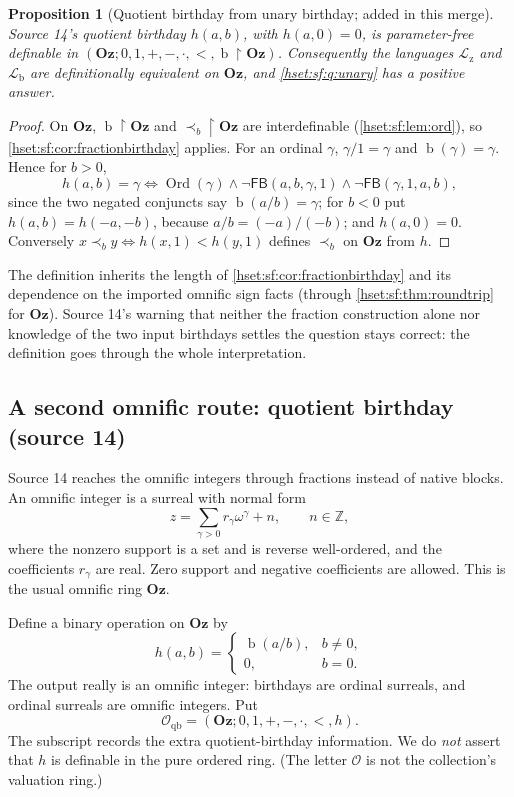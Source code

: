 \documentclass[11pt,letterpaper]{article}
\newtheorem{proposition}[proposition]{Proposition}\aliascntresetthe{proposition}
\theoremstyle{definition}
\theoremstyle{remark}
\newcommand{\Ord}{\operatorname{Ord}}
\newcommand{\bd}{\operatorname{b}}
\newcommand{\restr}{\mathbin{\upharpoonright}}
\newcommand{\Oz}{\mathbf{Oz}}
\newcommand{\Z}{\mathbb Z}
\newcommand{\precb}{\prec_b}
\newcommand{\FB}{\mathsf{FB}}
\newcommand{\Lb}{\mathcal L_{\mathrm b}}
\newcommand{\Lz}{\mathcal L_{\mathrm z}}
\begin{document}
\begin{proposition}[Quotient birthday from unary birthday; added in this merge]
\label{hset:sf:prop:unary}
Source 14's quotient birthday $h(a,b)$, with $h(a,0)=0$, is parameter-free
definable in $(\Oz;0,1,+,-,\cdot,<,\bd\restr\Oz)$. Consequently the languages
$\Lz$ and $\Lb$ are definitionally equivalent on $\Oz$, and \cref{hset:sf:q:unary}
has a positive answer.
\end{proposition}
\begin{proof}
On $\Oz$, $\bd\restr\Oz$ and $\precb\restr\Oz$ are interdefinable
(\cref{hset:sf:lem:ord}), so \cref{hset:sf:cor:fractionbirthday} applies. For an
ordinal $\gamma$, $\gamma/1=\gamma$ and $\bd(\gamma)=\gamma$. Hence for $b>0$,
\[
 h(a,b)=\gamma\iff\Ord(\gamma)\land\neg\FB(a,b,\gamma,1)\land\neg\FB(\gamma,1,a,b),
\]
since the two negated conjuncts say $\bd(a/b)=\gamma$; for $b<0$ put
$h(a,b)=h(-a,-b)$, because $a/b=(-a)/(-b)$; and $h(a,0)=0$. Conversely
$x\precb y\iff h(x,1)<h(y,1)$ defines $\precb$ on $\Oz$ from $h$.
\end{proof}

The definition inherits the length of \cref{hset:sf:cor:fractionbirthday} and its
dependence on the imported omnific sign facts (through
\cref{hset:sf:thm:roundtrip} for $\Oz$). Source 14's warning that neither the
fraction construction alone nor knowledge of the two input birthdays settles the
question stays correct: the definition goes through the whole interpretation.

\subsection{A second omnific route: quotient birthday (source 14)}
\label{hset:sf:sub:qb}

Source 14 reaches the omnific integers through fractions instead of native
blocks. An omnific integer is a surreal with normal form
\begin{equation}\label{hset:sf:eq:omnific}
 z=\sum_{\gamma>0}r_\gamma\omega^\gamma+n,\qquad n\in\Z,
\end{equation}
where the nonzero support is a set and is reverse well-ordered, and the
coefficients $r_\gamma$ are real. Zero support and negative coefficients are
allowed. This is the usual omnific ring $\Oz$.

Define a binary operation on $\Oz$ by
\begin{equation}\label{hset:sf:eq:h}
 h(a,b)=\begin{cases}\bd(a/b),&b\ne0,\\0,&b=0.\end{cases}
\end{equation}
The output really is an omnific integer: birthdays are ordinal surreals, and
ordinal surreals are omnific integers. Put
\[
 \mathcal O_{\mathrm{qb}}=(\Oz;0,1,+,-,\cdot,<,h).
\]
The subscript records the extra quotient-birthday information. We do \emph{not}
assert that $h$ is definable in the pure ordered ring. (The letter $\mathcal O$ is
not the collection's valuation ring.)
\end{document}
